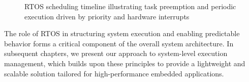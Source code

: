 \begin{figure}[H]
    \caption{RTOS scheduling timeline illustrating task preemption and periodic execution driven by priority and hardware interrupts}
    \label{fig:rtos_scheduling}
\end{figure}

The role of RTOS in structuring system execution and enabling predictable behavior forms a critical component of the overall system architecture. In subsequent chapters, we present our approach to system-level execution management, which builds upon these principles to provide a lightweight and scalable solution tailored for high-performance embedded applications.